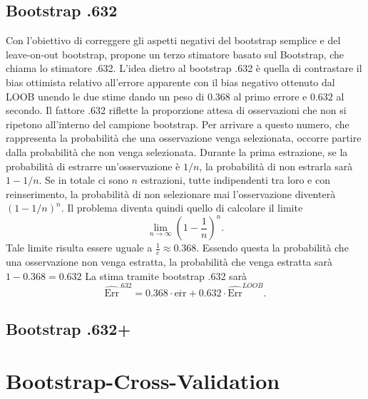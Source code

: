 \subsection{Bootstrap .632}
\label{sec:sezione5.4.3}


Con l'obiettivo di correggere gli aspetti negativi del bootstrap semplice e del leave-on-out bootstrap, \textcite{efron1983} propone un terzo stimatore basato sul Bootstrap, che chiama lo stimatore .632. L'idea dietro al bootstrap .632 è quella di contrastare il bias ottimista relativo all'errore apparente con il bias negativo ottenuto dal LOOB unendo le due stime dando un peso di $0.368$ al primo errore e $0.632$ al secondo. Il fattore .632 riflette la proporzione attesa di osservazioni che non si ripetono all'interno del campione bootstrap. Per arrivare a questo numero, che rappresenta la probabilità che una osservazione venga selezionata, occorre partire dalla probabilità che non venga selezionata. Durante la prima estrazione, se la probabilità di estrarre un'osservazione è $1/n$, la probabilità di non estrarla sarà $1-1/n$. Se in totale ci sono $n$ estrazioni, tutte indipendenti tra loro e con reinserimento, la probabilità di non selezionare mai l'osservazione diventerà $(1-1/n)^n$. Il problema diventa quindi quello di calcolare il limite
\begin{equation}
\lim_{n \to \infty} \left(1 - \frac{1}{n}\right)^n.
\end{equation}
Tale limite risulta essere uguale a $\frac{1}{e} \approx 0.368$. Essendo questa la probabilità che una osservazione non venga estratta, la probabilità che venga estratta sarà $1-0.368=0.632$
La stima tramite bootstrap .632 sarà
\begin{equation}
\widehat{\text{Err}}^{.632} = 0.368 \cdot \overline{\text{err}} + 0.632 \cdot \widehat{\text{Err}}^{LOOB}.
\end{equation}


\subsection{Bootstrap .632+}
\label{sec:sezione5.4.4}


\section{Bootstrap-Cross-Validation}
\label{sec:sezione5.5}















